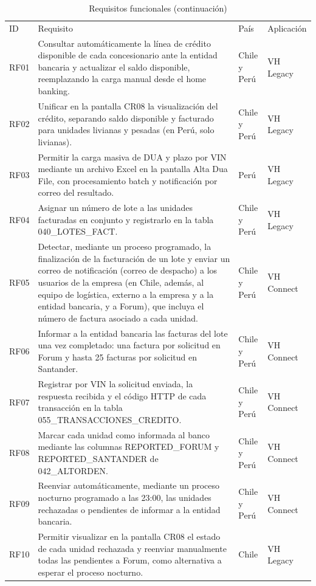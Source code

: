 \begin{longtable}[]{@{}
  >{\raggedright\arraybackslash}p{}
  >{\raggedright\arraybackslash}p{}
  >{\raggedright\arraybackslash}p{}
  >{\raggedright\arraybackslash}p{}@{}}
\caption{Requisitos funcionales}\label{tab:13}\\
\toprule\noalign{}
\endfirsthead
\caption[]{Requisitos funcionales (continuación)}\\
\toprule\noalign{}
\endhead
\bottomrule\noalign{}
\endlastfoot
ID & Requisito & País & Aplicación \\
RF01 & Consultar automáticamente la línea de crédito disponible de cada concesionario ante la entidad bancaria y actualizar el saldo disponible, reemplazando la carga manual desde el home banking. & Chile y Perú & VH Legacy \\
RF02 & Unificar en la pantalla CR08 la visualización del crédito, separando saldo disponible y facturado para unidades livianas y pesadas (en Perú, solo livianas). & Chile y Perú & VH Legacy \\
RF03 & Permitir la carga masiva de DUA y plazo por VIN mediante un archivo Excel en la pantalla Alta Dua File, con procesamiento batch y notificación por correo del resultado. & Perú & VH Legacy \\
RF04 & Asignar un número de lote a las unidades facturadas en conjunto y registrarlo en la tabla 040\_LOTES\_FACT. & Chile y Perú & VH Legacy \\
RF05 & Detectar, mediante un proceso programado, la finalización de la facturación de un lote y enviar un correo de notificación (correo de despacho) a los usuarios de la empresa (en Chile, además, al equipo de logística, externo a la empresa y a la entidad bancaria, y a Forum), que incluya el número de factura asociado a cada unidad. & Chile y Perú & VH Connect \\
RF06 & Informar a la entidad bancaria las facturas del lote una vez completado: una factura por solicitud en Forum y hasta 25 facturas por solicitud en Santander. & Chile y Perú & VH Connect \\
RF07 & Registrar por VIN la solicitud enviada, la respuesta recibida y el código HTTP de cada transacción en la tabla 055\_TRANSACCIONES\_CREDITO. & Chile y Perú & VH Connect \\
RF08 & Marcar cada unidad como informada al banco mediante las columnas REPORTED\_FORUM y REPORTED\_SANTANDER de 042\_ALTORDEN. & Chile y Perú & VH Connect \\
RF09 & Reenviar automáticamente, mediante un proceso nocturno programado a las 23:00, las unidades rechazadas o pendientes de informar a la entidad bancaria. & Chile y Perú & VH Connect \\
RF10 & Permitir visualizar en la pantalla CR08 el estado de cada unidad rechazada y reenviar manualmente todas las pendientes a Forum, como alternativa a esperar el proceso nocturno. & Chile & VH Legacy \\
\end{longtable}


